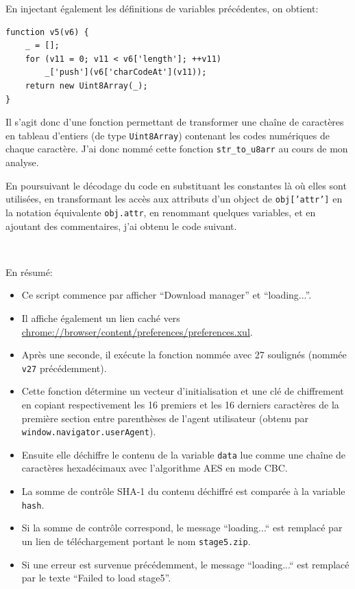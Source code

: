 \documentclass[a4paper,10pt]{article}
\newcommand{\pyinput}[1]{%
    \noindent{\color[rgb]{0.5, 0.5, 0.5}{\rule{\textwidth}{0.4pt}}}
     \\
    \noindent{\color[rgb]{0.5, 0.5, 0.5}{\rule{\textwidth}{0.4pt}}}
}
\begin{document}
En injectant également les définitions de variables précédentes, on obtient:
\begin{verbatim}
function v5(v6) {
    _ = [];
    for (v11 = 0; v11 < v6['length']; ++v11)
        _['push'](v6['charCodeAt'](v11));
    return new Uint8Array(_);
}
\end{verbatim}

Il s'agit donc d'une fonction permettant de transformer une chaîne de caractères en tableau d'entiers (de type \texttt{Uint8Array}) contenant les codes numériques de chaque caractère.
J'ai donc nommé cette fonction \texttt{str\_to\_u8arr} au cours de mon analyse.

En poursuivant le décodage du code en substituant les constantes là où elles sont utilisées, en transformant les accès aux attributs d'un object de \texttt{obj['attr']} en la notation équivalente \texttt{obj.attr}, en renommant quelques variables, et en ajoutant des commentaires, j'ai obtenu le code suivant.

\pyinput{stage4/decoded.js.inc.tex}

\clearpage

En résumé:
\begin{itemize}
  \item Ce script commence par afficher ``Download manager'' et ``loading...''.
  \item Il affiche également un lien caché vers \url{chrome://browser/content/preferences/preferences.xul}.
  \item Après une seconde, il exécute la fonction nommée avec 27 soulignés (nommée \texttt{v27} précédemment).
  \item Cette fonction détermine un vecteur d'initialisation et une clé de chiffrement en copiant respectivement les 16 premiers et les 16 derniers caractères de la première section entre parenthèses de l'agent utilisateur (obtenu par \texttt{window.navigator.userAgent}).
  \item Ensuite elle déchiffre le contenu de la variable \texttt{data} lue comme une chaîne de caractères hexadécimaux avec l'algorithme AES en mode CBC.
  \item La somme de contrôle SHA-1 du contenu déchiffré est comparée à la variable \texttt{hash}.
  \item Si la somme de contrôle correspond, le message ``loading...`` est remplacé par un lien de téléchargement portant le nom \texttt{stage5.zip}.
  \item Si une erreur est survenue précédemment, le message ``loading...`` est remplacé par le texte ``Failed to load stage5''.
\end{itemize}
\end{document}
